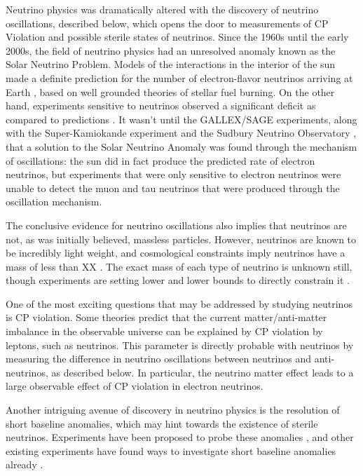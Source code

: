 Neutrino physics was dramatically altered with the discovery of neutrino oscillations, described below, which opens the door to measurements of CP Violation and possible sterile states of neutrinos.  Since the 1960s until the early 2000s, the field of neutrino physics had an unresolved anomaly known as the Solar Neutrino Problem.  Models of the interactions in the interior of the sun made a definite prediction for the number of electron-flavor neutrinos arriving at Earth \cite{solar_neutrinos}, based on well grounded theories of stellar fuel burning.  On the other hand, experiments sensitive to neutrinos observed a significant deficit as compared to predictions \cite{davis}.  It wasn't until the GALLEX/SAGE \cite{gallex} \cite{sage} experiments, along with the Super-Kamiokande experiment \cite{superK} and the Sudbury Neutrino Observatory \cite{SNO}, that a solution to the Solar Neutrino Anomaly was found through the mechanism of oscillations: the sun did in fact produce the predicted rate of electron neutrinos, but experiments that were only sensitive to electron neutrinos were unable to detect the muon and tau neutrinos that were produced through the oscillation mechanism.  

The conclusive evidence for neutrino oscillations also implies that neutrinos are not, as was initially believed, massless particles.  However, neutrinos are known to be incredibly light weight, and cosmological constraints imply neutrinos have a mass of less than  XX \cite{cosmological_neutrinos}.  The exact mass of each type of neutrino is unknown still, though experiments are setting lower and lower bounds to directly constrain it \cite{katrin}.

One of the most exciting questions that may be addressed by studying neutrinos is CP violation.  Some theories predict that the current matter/anti-matter imbalance in the observable universe can be explained by CP violation by leptons, such as neutrinos. \cite{CP_theories}  This parameter is directly probable with neutrinos by measuring the difference in neutrino oscillations between neutrinos and anti-neutrinos, as described below.  In particular, the neutrino matter effect \cite{matter_effect} leads to a large observable effect of CP violation in electron neutrinos.

Another intriguing avenue of discovery in neutrino physics is the resolution of short baseline anomalies, which may hint towards the existence of sterile neutrinos.  Experiments have been proposed to probe these anomalies \cite{SBN, prospect}, and other existing experiments have found ways to investigate short baseline anomalies already \cite{icecube, nova_steriles, minos_steriles, daya_bay_steriles}.

